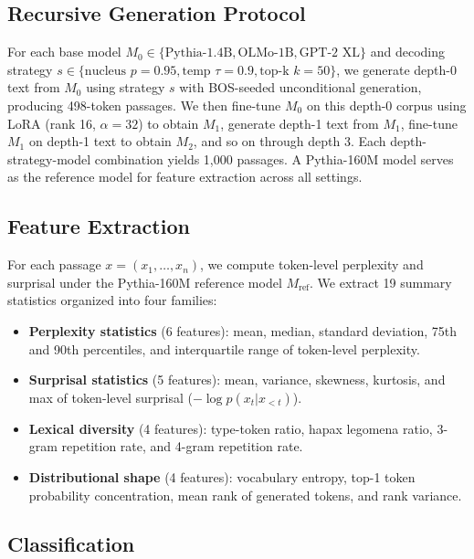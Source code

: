 \documentclass[11pt,a4paper]{article}
\begin{document}
\subsection{Recursive Generation Protocol}

For each base model $M_0 \in \{\text{Pythia-1.4B}, \text{OLMo-1B}, \text{GPT-2 XL}\}$ and decoding strategy $s \in \{\text{nucleus } p{=}0.95, \text{temp } \tau{=}0.9, \text{top-k } k{=}50\}$, we generate depth-0 text from $M_0$ using strategy $s$ with BOS-seeded unconditional generation, producing 498-token passages.
We then fine-tune $M_0$ on this depth-0 corpus using LoRA (rank 16, $\alpha{=}32$) to obtain $M_1$, generate depth-1 text from $M_1$, fine-tune $M_1$ on depth-1 text to obtain $M_2$, and so on through depth 3.
Each depth-strategy-model combination yields 1{,}000 passages.
A Pythia-160M model serves as the reference model for feature extraction across all settings.

\subsection{Feature Extraction}
\label{sec:features}

For each passage $x = (x_1, \ldots, x_n)$, we compute token-level perplexity and surprisal under the Pythia-160M reference model $M_{\text{ref}}$.
We extract 19 summary statistics organized into four families:

\begin{itemize}
\item \textbf{Perplexity statistics} (6 features): mean, median, standard deviation, 75th and 90th percentiles, and interquartile range of token-level perplexity.
\item \textbf{Surprisal statistics} (5 features): mean, variance, skewness, kurtosis, and max of token-level surprisal ($-\log p(x_t | x_{<t})$).
\item \textbf{Lexical diversity} (4 features): type-token ratio, hapax legomena ratio, 3-gram repetition rate, and 4-gram repetition rate.
\item \textbf{Distributional shape} (4 features): vocabulary entropy, top-1 token probability concentration, mean rank of generated tokens, and rank variance.
\end{itemize}

\subsection{Classification}
\end{document}
